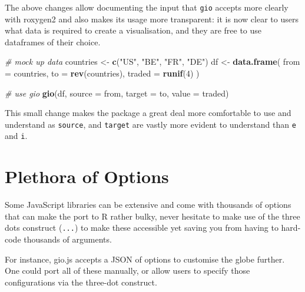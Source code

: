 \documentclass[
]{krantz}
\makeatletter
\newenvironment{Shaded}{\begin{snugshade}}{\end{snugshade}}
\newcommand{\CommentTok}[1]{\textcolor[rgb]{0.37,0.37,0.37}{\textit{#1}}}
\newcommand{\DataTypeTok}[1]{\textcolor[rgb]{0.27,0.27,0.27}{#1}}
\newcommand{\DecValTok}[1]{\textcolor[rgb]{0.06,0.06,0.06}{#1}}
\newcommand{\KeywordTok}[1]{\textcolor[rgb]{0.27,0.27,0.27}{\textbf{#1}}}
\newcommand{\NormalTok}[1]{#1}
\newcommand{\StringTok}[1]{\textcolor[rgb]{0.5,0.5,0.5}{#1}}
\newenvironment{kframe}{%
\medskip{}
\setlength{\fboxsep}{.8em}
 \def\at@end@of@kframe{}%
 \ifinner\ifhmode%
  \def\at@end@of@kframe{\end{minipage}}%
  \begin{minipage}{\columnwidth}%
 \fi\fi%
 \def\FrameCommand##1{\hskip\@totalleftmargin \hskip-\fboxsep
 \colorbox{shadecolor}{##1}\hskip-\fboxsep
     \hskip-\linewidth \hskip-\@totalleftmargin \hskip\columnwidth}%
 \MakeFramed {\advance\hsize-\width
   \@totalleftmargin\z@ \linewidth\hsize
   \@setminipage}}%
 {\par\unskip\endMakeFramed%
 \at@end@of@kframe}
\renewenvironment{Shaded}{\begin{kframe}}{\end{kframe}}
\makeatother
\begin{document}
The above changes allow documenting the input that \texttt{gio} accepts more clearly with roxygen2 and also makes its usage more transparent: it is now clear to users what data is required to create a visualisation, and they are free to use dataframes of their choice.

\begin{Shaded}
\begin{Highlighting}[]
\CommentTok{\# mock up data}
\NormalTok{countries <{-}}\StringTok{ }\KeywordTok{c}\NormalTok{(}\StringTok{"US"}\NormalTok{, }\StringTok{"BE"}\NormalTok{, }\StringTok{"FR"}\NormalTok{, }\StringTok{"DE"}\NormalTok{)}
\NormalTok{df <{-}}\StringTok{ }\KeywordTok{data.frame}\NormalTok{(}
  \DataTypeTok{from =}\NormalTok{ countries,}
  \DataTypeTok{to =} \KeywordTok{rev}\NormalTok{(countries),}
  \DataTypeTok{traded =} \KeywordTok{runif}\NormalTok{(}\DecValTok{4}\NormalTok{)}
\NormalTok{)}

\CommentTok{\# use gio}
\KeywordTok{gio}\NormalTok{(df, }\DataTypeTok{source =}\NormalTok{ from, }\DataTypeTok{target =}\NormalTok{ to, }\DataTypeTok{value =}\NormalTok{ traded)}
\end{Highlighting}
\end{Shaded}

This small change makes the package a great deal more comfortable to use and understand as \texttt{source}, and \texttt{target} are vastly more evident to understand than \texttt{e} and \texttt{i}.

\hypertarget{widgets-final-options}{%
\section{Plethora of Options}\label{widgets-final-options}}

Some JavaScript libraries can be extensive and come with thousands of options that can make the port to R rather bulky, never hesitate to make use of the three dots construct (\texttt{...}) to make these accessible yet saving you from having to hard-code thousands of arguments.

For instance, gio.js accepts a JSON of options to customise the globe further. One could port all of these manually, or allow users to specify those configurations via the three-dot construct.
\end{document}

